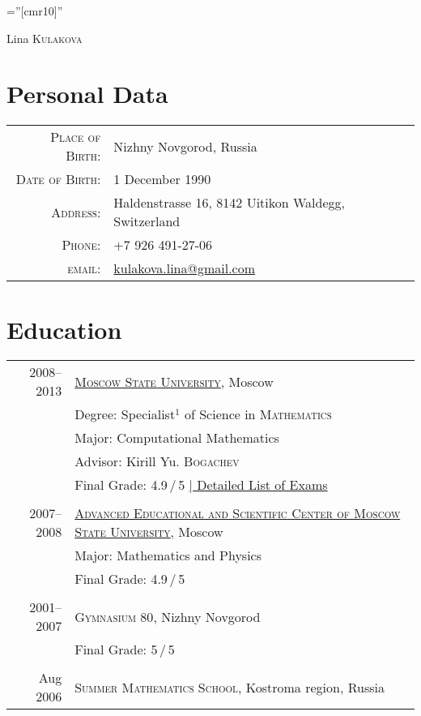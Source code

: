\documentclass[a4paper,10pt]{article}
\begin{document}
\pagestyle{empty} %

\font\fb=''[cmr10]'' %

\par{%
		{\Huge Lina \textsc{Kulakova}
	}\bigskip\par}

	
\section{Personal Data}

\begin{tabular}{rl}
    \textsc{Place of Birth:} & Nizhny Novgorod, Russia \\
    \textsc{Date of Birth:} & 1 December 1990 \\
    \textsc{Address:}   & Haldenstrasse 16, 8142 Uitikon Waldegg, Switzerland \\
    \textsc{Phone:}     & +7 926 491-27-06\\
    \textsc{email:}     & \href{mailto:kulakova.lina@gmail.com}{kulakova.lina@gmail.com}
\end{tabular}

\section{Education}
\begin{tabular}{r|p{13cm}}
 2008--2013 & \href{http://www.msu.ru/en/}{\textsc{Moscow State University}}, Moscow\\
 & Degree: Specialist$^1\!\!$ of Science in \textsc{Mathematics}\\
 & Major: Computational Mathematics\\
 & Advisor: Kirill Yu. \textsc{Bogachev}\\
 &\normalsize Final Grade: 4.9\,/\,5 \hyperlink{grds}{\hfill | \footnotesize Detailed List of Exams}\\

\multicolumn{2}{c}{} \\

 2007--2008& \href{http://www.aesc.msu.ru/}{\textsc{Advanced Educational and Scientific Center of Moscow State University}}, Moscow \\
 & Major: Mathematics and Physics \\
 &Final Grade: 4.9\,/\,5\\

\multicolumn{2}{c}{} \\

 2001--2007& \textsc{Gymnasium 80}, Nizhny Novgorod \\
 & Final Grade: 5\,/\,5\\

\multicolumn{2}{c}{} \\

 Aug 2006 & \textsc{Summer Mathematics School}, Kostroma region, Russia
\end{tabular}
\linebreak
\end{document}
